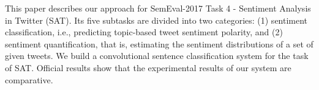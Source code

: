 This paper describes our approach for SemEval-2017 Task 4 - Sentiment Analysis in Twitter (SAT). Its five subtasks are divided into two categories: (1) sentiment classification, i.e., predicting topic-based tweet sentiment polarity, and (2) sentiment quantification, that is, estimating the sentiment distributions of a set of given tweets. We build a convolutional sentence classification system for the task of SAT. Official results show that the experimental results of our system are comparative.
